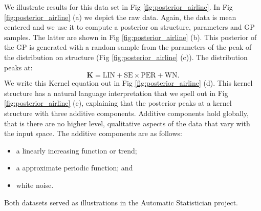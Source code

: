We illustrate results for this data set in Fig \ref{fig:posterior_airline}. In Fig \ref{fig:posterior_airline} (a) we depict the raw data. 
Again, the data is mean centered and we use it to 
compute a posterior on structure, parameters and \ac{GP}
samples.
The latter are shown in  Fig \ref{fig:posterior_airline} (b).
This posterior of the \ac{GP} is generated with a random sample from the parameters
of the peak of the distribution on structure (Fig \ref{fig:posterior_airline} (c)).
The distribution peaks at:
\begin{equation}
\mathbf{K}=\text{LIN} +  \text{SE} \times \text{PER}+ \text{WN}.
\end{equation}
We write this Kernel equation out in Fig \ref{fig:posterior_airline} (d).
This kernel structure has a natural language interpretation that we spell out in
Fig \ref{fig:posterior_airline} (e), explaining that 
the posterior peaks at a kernel structure with three additive components.
Additive components hold globally, that is there are no higher level, qualitative aspects
of the data that vary with the input space.
The additive components are as follows: 
\begin{itemize}
\item a linearly increasing function or trend;
\item a approximate periodic function; and
\item  white noise.
\end{itemize}
Both datasets served as illustrations in the Automatic Statistician project.



